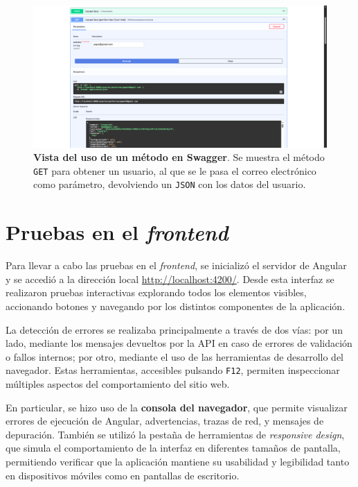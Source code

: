 \begin{figure}[H]
	\centering
	\includegraphics[width=1\linewidth]{imagenes/swagger2.png}
	\caption[\textbf{Vista del uso de un método en Swagger}.]{\textbf{Vista del uso de un método en Swagger}. Se muestra el método \texttt{GET} para obtener un usuario, al que se le pasa el correo electrónico como parámetro, devolviendo un \texttt{JSON} con los datos del usuario.}
	\label{swagger-2}
\end{figure}

\newpage

\section{Pruebas en el \textit{frontend}}

Para llevar a cabo las pruebas en el \textit{frontend}, se inicializó el servidor de Angular y se accedió a la dirección local \href{http://localhost:4200/}{http://localhost:4200/}. Desde esta interfaz se realizaron pruebas interactivas explorando todos los elementos visibles, accionando botones y navegando por los distintos componentes de la aplicación.

La detección de errores se realizaba principalmente a través de dos vías: por un lado, mediante los mensajes devueltos por la API en caso de errores de validación o fallos internos; por otro, mediante el uso de las herramientas de desarrollo del navegador. Estas herramientas, accesibles pulsando \texttt{F12}, permiten inspeccionar múltiples aspectos del comportamiento del sitio web.

En particular, se hizo uso de la \textbf{consola del navegador}, que permite visualizar errores de ejecución de Angular, advertencias, trazas de red, y mensajes de depuración. También se utilizó la pestaña de herramientas de \textit{responsive design}, que simula el comportamiento de la interfaz en diferentes tamaños de pantalla, permitiendo verificar que la aplicación mantiene su usabilidad y legibilidad tanto en dispositivos móviles como en pantallas de escritorio.

